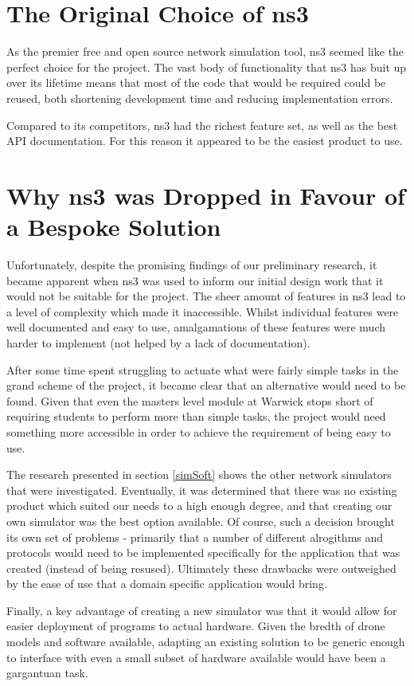 \section{The Original Choice of ns3}
As the premier free and open source network simulation tool, ns3 seemed like the perfect choice for the project. The vast body of functionality that ns3 has buit up over its lifetime means that most of the code that would be required could be reused, both shortening development time and reducing implementation errors.

Compared to its competitors, ns3 had the richest feature set, as well as the best API documentation. For this reason it appeared to be the easiest product to use.

\section{Why ns3 was Dropped in Favour of a Bespoke Solution}
Unfortunately, despite the promising findings of our preliminary research, it became apparent when ns3  was used to inform our initial design work that it would not be suitable for the project. The sheer amount of features in ns3 lead to a level of complexity which made it inaccessible. Whilst individual features were well documented and easy to use, amalgamations of these features were much harder to implement (not helped by a lack of documentation).

After some time spent struggling to actuate what were fairly simple tasks in the grand scheme of the project, it became clear that an alternative would need to be found. Given that even the masters level module at Warwick stops short of requiring students to perform more than simple tasks, the project would need something more accessible in order to achieve the requirement of being easy to use.

The research presented in section \ref{simSoft} shows the other network simulators that were investigated. Eventually, it was determined that there was no existing product which suited our needs to a high enough degree, and that creating our own simulator was the best option available. Of course, such a decision brought its own set of problems - primarily that a number of different alrogithms and protocols would need to be implemented specifically for the application that was created (instead of being resused). Ultimately these drawbacks were outweighed by the ease of use that a domain specific application would bring.

Finally, a key advantage of creating a new simulator was that it would allow for easier deployment of programs to actual hardware. Given the bredth of drone models and software available, adapting an existing solution to be generic enough to interface with even a small subset of hardware available would have been a gargantuan task.

